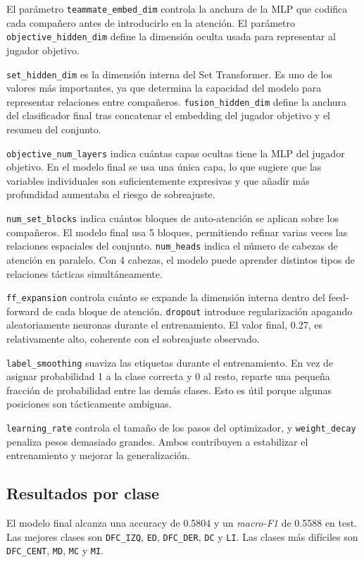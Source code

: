 El parámetro \texttt{teammate\_embed\_dim} controla la anchura de la MLP que codifica cada compañero antes de introducirlo en la atención. El parámetro \texttt{objective\_hidden\_dim} define la dimensión oculta usada para representar al jugador objetivo.

\texttt{set\_hidden\_dim} es la dimensión interna del Set Transformer. Es uno de los valores más importantes, ya que determina la capacidad del modelo para representar relaciones entre compañeros. \texttt{fusion\_hidden\_dim} define la anchura del clasificador final tras concatenar el embedding del jugador objetivo y el resumen del conjunto.

\texttt{objective\_num\_layers} indica cuántas capas ocultas tiene la MLP del jugador objetivo. En el modelo final se usa una única capa, lo que sugiere que las variables individuales son suficientemente expresivas y que añadir más profundidad aumentaba el riesgo de sobreajuste.

\texttt{num\_set\_blocks} indica cuántos bloques de auto-atención se aplican sobre los compañeros. El modelo final usa 5 bloques, permitiendo refinar varias veces las relaciones espaciales del conjunto. \texttt{num\_heads} indica el número de cabezas de atención en paralelo. Con 4 cabezas, el modelo puede aprender distintos tipos de relaciones tácticas simultáneamente.

\texttt{ff\_expansion} controla cuánto se expande la dimensión interna dentro del feed-forward de cada bloque de atención. \texttt{dropout} introduce regularización apagando aleatoriamente neuronas durante el entrenamiento. El valor final, 0.27, es relativamente alto, coherente con el sobreajuste observado.

\texttt{label\_smoothing} suaviza las etiquetas durante el entrenamiento. En vez de asignar probabilidad 1 a la clase correcta y 0 al resto, reparte una pequeña fracción de probabilidad entre las demás clases. Esto es útil porque algunas posiciones son tácticamente ambiguas.

\texttt{learning\_rate} controla el tamaño de los pasos del optimizador, y \texttt{weight\_decay} penaliza pesos demasiado grandes. Ambos contribuyen a estabilizar el entrenamiento y mejorar la generalización.

\subsection{Resultados por clase}

El modelo final alcanza una accuracy de 0.5804 y un \textit{macro-F1} de 0.5588 en test. Las mejores clases son \texttt{DFC\_IZQ}, \texttt{ED}, \texttt{DFC\_DER}, \texttt{DC} y \texttt{LI}. Las clases más difíciles son \texttt{DFC\_CENT}, \texttt{MD}, \texttt{MC} y \texttt{MI}.

